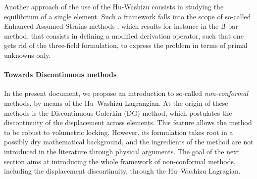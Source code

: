 Another approach of the use of the Hu-Washizu consists in
studying the equilibrium of a single element. Such a framework falls
into the scope of so-called Enhanced Assumed Strains methods
\cite{simo_variational_1986,simo_class_1990}, which results for instance
in the B-bar method, that consists in defining a modified derivation
operator, such that one gets rid of the three-field formulation, to
express the problem in terms of primal unknowns only.

\paragraph{Towards Discontinuous methods}

In the present document, we propose an introduction to so-called
\textit{non-conformal} methods, by means of the Hu–Washizu Lagrangian.
At the origin of these methods is the Discontinuous Galerkin (DG)
method, which postulates the discontinuity of the displacement across
elements. This feature allows the method to be robust to volumetric
locking. However, its formulation takes root in a possibly dry
mathematical background, and the ingredients of the method are not
introduced in the literature through physical arguments. The goal of the
next section aims at introducing the whole framework of non-conformal
methods, including the displacement discontinuity, through the
Hu–Washizu Lagragian.








